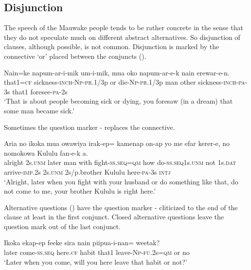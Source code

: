 \subsection{Disjunction} \label{sec:8.1.2}

The speech of the Mauwake people tends to be rather concrete in the sense that they do not speculate much on different abstract alternatives. So disjunction of clauses, although possible, is not common. Disjunction is marked by the connective  `or' placed between the conjuncts (). 

\ea%
\label{ex:8:x1385}
\gll Nain=ke  napum-ar-i-mik    um-i-mik,  mua  oko napum-ar-e-k  nain  erewar-e-n. \\
that1=\textsc{cf}  sickness-\textsc{inch}-\textsc{Np}-\textsc{pr}.1/3p  or  die-\textsc{Np}-\textsc{pr}.1/3p  man  other sickness-\textsc{inch}-\textsc{pa}-3s  that1  foresee-\textsc{pa}-2s     \\
\glt`That is about people becoming sick or dying, you foresaw (in a dream) that some man became sick.'
\z


Sometimes the question marker -  replaces the connective.

\ea%
\label{ex:8:x1387}
\gll Aria  no  ikoka  mua  owawiya  irak-ep=  kamenap  on-ap  yo  me  efar  kerer-e,  no nomokowa  Kululu  fan-e-k  a.\\
 alright  2s.\textsc{unm}  later  man  with  fight-\textsc{ss}.\textsc{seq}=\textsc{qm}  how do-\textsc{ss}.\textsc{seq}1s.\textsc{unm}  not  1s.\textsc{dat}  arrive-\textsc{imp}.2s  2s.\textsc{unm} 2s/p.brother  Kululu  here-\textsc{pa}-3s  \textsc{intj}\\
\glt`Alright, later when you fight with your husband or do something like that, do not come to me, your brother Kululu is right here.'
\z


Alternative questions () have the question marker - cliticized to the end of the clause at least in the first conjunct. Closed alternative questions leave the question mark out of the last conjunct. 

\ea%
\label{ex:8:x1386}
\gll Ikoka  ekap-ep  feeke  sira  nain  piipua-i-nan=   weetak?\\
later  come-\textsc{ss}.\textsc{seq}  here.\textsc{cf}  habit  that1  leave-\textsc{Np}-\textsc{fu}.2s=\textsc{qm} or  no\\
\glt`Later when you come, will you here leave that habit or not?'
\z


